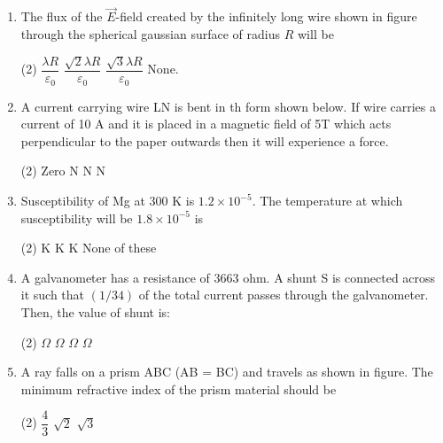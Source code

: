 \documentclass[twocolumn]{article}
\renewcommand{\frac}[2]{\dfrac{#1}{#2}}
\begin{document}
\begin{enumerate}
    \item The flux of the \( \vec{E} \)-field created by the infinitely long wire shown in figure through the spherical gaussian surface of radius \( R \) will be
    \begin{center}
    \end{center}
    \begin{tasks}(2)
        \task \( \frac{\lambda R}{\varepsilon_0} \)
        \task \( \frac{\sqrt{2}\lambda R}{\varepsilon_0} \)
        \task \( \frac{\sqrt{3}\lambda R}{\varepsilon_0} \)
        \task None.
    \end{tasks}

  \item 
  A current carrying wire LN is bent in th form shown below. If wire carries a current of 10 A and it is placed in a magnetic field of 5T which acts perpendicular to the paper outwards then it will experience a force.
  \begin{tasks}(2)
    \task Zero
     N
     N
     N
  \end{tasks}
  \begin{center}
  \end{center}
  
  \item 
  Susceptibility of Mg at 300 K is \( 1.2 \times 10^{-5} \). The temperature at which susceptibility will be \( 1.8 \times10^{-5} \) is
  \begin{tasks}(2)
     K
     K
     K
    \task None of these
  \end{tasks}
  
  \item 
  A galvanometer has a resistance of \( 3663 \) ohm. A shunt S is connected across it such that \( (1/34) \) of the total current passes through the galvanometer. Then, the value of shunt is:
  \begin{tasks}(2)
     \(\Omega\)
     \(\Omega\)
     \(\Omega\)
     \(\Omega\)
  \end{tasks}
  
  \item 
  A ray falls on a prism ABC (AB = BC) and travels as shown in figure. The minimum refractive index of the prism material should be 
  \begin{tasks}(2)
    \task \( \frac{4}{3} \)
    \task \( \sqrt{2} \)
    \task \( \sqrt{3} \)
  \end{tasks}
  \begin{center}
  \end{center}


\end{enumerate}
\end{document}
